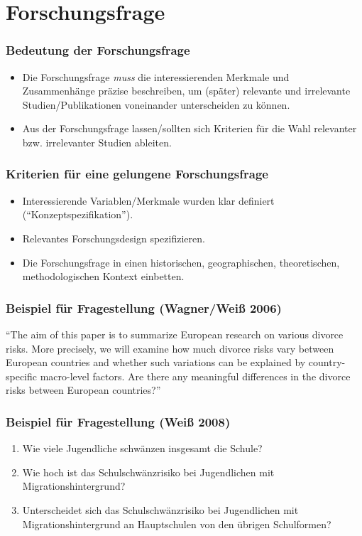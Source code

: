 \section{Forschungsfrage}

\begin{frame}
  \frametitle{Bedeutung der Forschungsfrage}
  \begin{itemize}[<+->]
  \item Die Forschungsfrage \emph{muss} die interessierenden Merkmale und Zusammenhänge präzise beschreiben, um (später)
    relevante und irrelevante Studien/Publikationen voneinander unterscheiden zu können.
  \item Aus der Forschungsfrage lassen/sollten sich Kriterien für die Wahl relevanter bzw. irrelevanter Studien ableiten.
  \end{itemize}
\end{frame}


\begin{frame}
  \frametitle{Kriterien für eine gelungene Forschungsfrage}
  \begin{itemize}[<+->]
  \item Interessierende Variablen/Merkmale wurden klar definiert ("`Konzeptspezifikation"').
  \item Relevantes Forschungsdesign spezifizieren.
  \item Die Forschungsfrage in einen historischen, geographischen, theoretischen, methodologischen Kontext einbetten.
  \end{itemize}
\end{frame}


\begin{frame}[plain]
  \frametitle{Beispiel für Fragestellung (Wagner/Weiß 2006)}
  \begin{small}
    "`The aim of this paper is to summarize \alert{European} research on various \alert{divorce risks}. More precisely,
    we will examine how much divorce risks vary between European countries and whether such variations can be explained by
    country-specific macro-level factors. Are there any meaningful differences in the divorce risks between European
    countries?"'
  \end{small}
\end{frame}


\begin{frame}
  \frametitle{Beispiel für Fragestellung (Weiß 2008)}
  \begin{enumerate}[<+->]
  \item Wie viele Jugendliche schwänzen insgesamt die Schule?
  \item Wie hoch ist das Schulschwänzrisiko bei Jugendlichen mit Migrationshintergrund?
  \item Unterscheidet sich das Schulschwänzrisiko bei Jugendlichen mit Migrationshintergrund an Hauptschulen von den
    übrigen Schulformen?
  \end{enumerate}
\end{frame}


